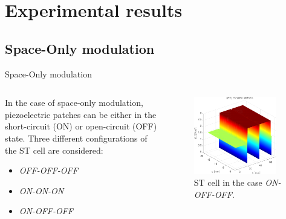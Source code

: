 \section{Experimental results}


\subsection{Space-Only modulation}

\begin{frame}{Space-Only modulation}

    \begin{columns}[c, onlytextwidth]

        \begin{column}{0.55\textwidth}

            In the case of space-only modulation, piezoelectric patches can be either in the short-circuit (ON) or open-circuit (OFF) state.
            Three different configurations of the ST cell are considered:

            \begin{itemize}
                \item \textit{OFF-OFF-OFF}
                \item \textit{ON-ON-ON}
                \item \textit{ON-OFF-OFF}
            \end{itemize}

        \end{column}

        \begin{column}{0.45\textwidth}

            \begin{figure}[H]
                \centering
                \includegraphics[width=0.9\textwidth]{img/MATLAB/ST_cell_ON-OFF-OFF.pdf}
                \caption{ST cell in the case \textit{ON-OFF-OFF}.}
            \end{figure}


\end{column}
\end{columns}
\end{frame}
